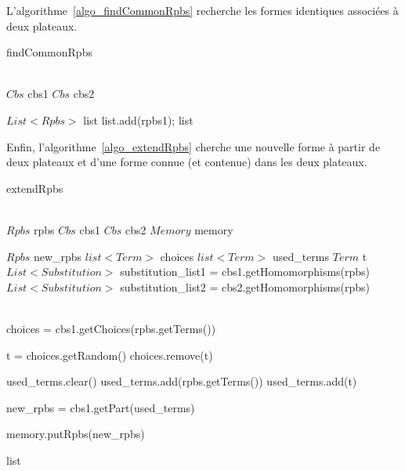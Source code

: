 L'algorithme~\vref{algo_findCommonRpbs} recherche les formes identiques associées à deux plateaux.
 
\begin{algorithm}[H]
	\caption{findCommonRpbs}
	\label{algo_findCommonRpbs}
	\KwData
	{
		\\
		$Cbs$ cbs1\;
		$Cbs$ cbs2\;
	}	
  \vspace{0.2cm}
  
  $List<Rpbs>$ list\;
		{
				{
					{
						list.add(rpbs1);
					}
				}
		}
		\Return list\;
\end{algorithm}

Enfin, l'algorithme~\vref{algo_extendRpbs} cherche une nouvelle forme à partir de deux plateaux et d'une forme connue (et contenue) dans les deux plateaux.


\begin{algorithm}[H]
	\caption{extendRpbs}
	\label{algo_extendRpbs}
	\KwData
	{
	\\
		$Rpbs$ rpbs\;
		$Cbs$ cbs1\;
		$Cbs$ cbs2\;
		$Memory$ memory\;
	}	
  \vspace{0.2cm}
  
  $Rpbs$ new\_rpbs\;
  $list<Term>$ choices\;
  $list<Term>$ used\_terms\;
  $Term$ t\;
	$List<Substitution>$ substitution\_list1 = cbs1.getHomomorphisms(rpbs)\;
  $List<Substitution>$ substitution\_list2 = cbs2.getHomomorphisms(rpbs)\;

		{
			
			 \\
			choices = cbs1.getChoices(rpbs.getTerms())\;
				{
					t = choices.getRandom()\;
					choices.remove(t)\;
					
					used\_terms.clear()\;
					used\_terms.add(rpbs.getTerms())\;
					used\_terms.add(t)\;
						
					new\_rpbs = cbs1.getPart(used\_terms)\;
						{
							{
								{
									memory.putRpbs(new\_rpbs)\;
								}
							
							}
						}
				}
		}
		\Return list\;
\end{algorithm}


